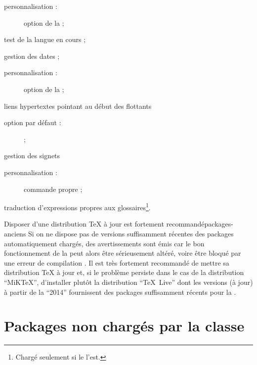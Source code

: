 \begin{description}
\begin{description}
  \item[personnalisation :] option  de la \yatcl ;
  \end{description}
\item[\package*{iflang} :] test de la langue en cours ;
\item[\package{datetime} :] gestion des dates ;
  \begin{description}
  \item[personnalisation :] option  de la \yatcl ;
  \end{description}
\item[\package*{hypcap} :] liens hypertextes pointant au début des
  flottants%
  \begin{description}
  \item[option par défaut :]  ;
  \end{description}
\item[\package{bookmark} :] gestion des signets%
  \begin{description}
  \item[personnalisation :] commande propre  ;
  \end{description}
\item[\package*{glossaries-babel} :] traduction d'expressions propres aux
  glossaires\footnote{Chargé seulement si le  l'est.}.
\end{description}

\begin{dbremark}{Disposer d'une distribution \TeX{} à jour est fortement
    recommandé}{packages-anciens}
  Si on ne dispose pas de versions suffisamment récentes des packages
  automatiquement chargés, des avertissements sont émis car le bon
  fonctionnement de la \yatcl{} peut alors être sérieusement altéré, voire être
  bloqué par une erreur de compilation . Il
  est très fortement recommandé de mettre sa distribution \TeX{} à jour et, si
  le problème persiste dans le cas de la distribution \enquote{MiK\TeX{}},
  d'installer plutôt la distribution \enquote{\TeX~Live} dont les versions (à
  jour) à partir de la \enquote{2014} fournissent des packages suffisamment
  récents pour la \yatcl.
\end{dbremark}

\section{Packages non  chargés par la classe}\label{sec-packages-non-charges}

